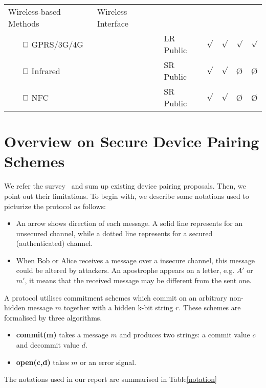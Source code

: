 \begin{table}[ht]
{\begin{tabular}{ p{3.5cm} p{3cm} l | l l l l }
Wireless-based Methods & Wireless Interface & & & & &  \\ 
$\qed$ GPRS/3G/4G & & LR Public & $\surd$ &$\surd$ & $\surd$ & $\surd$  \\
$\qed$ Infrared & & SR Public & $\surd$ & $\surd$ & \O & \O \\ 
$\qed$ NFC & & SR Public & $\surd$ & $\surd$ & \O& \O \\ \hline
\end{tabular}
}
\end{table}

\section{Overview on Secure Device Pairing Schemes}

We refer the survey~\cite{6687314} and sum up existing device pairing proposals. Then, we point out their limitations. To begin with, we describe some notations used to picturize the protocol as follows:

\begin{itemize}
\item An arrow shows direction of each message. A solid line represents for an unsecured channel, while a dotted line represents for a secured (authenticated) channel. 
\item When Bob or Alice receives a message over a insecure channel, this message could be altered by attackers. An apostrophe appears on a letter, e.g. $A'$ or $m'$, it means that the received message may be different from the sent one. 
\end{itemize}

A protocol utilises commitment schemes which commit on an arbitrary non-hidden message $m$ together with a hidden k-bit string $r$. These schemes are formalised by three algorithms.

\begin{itemize}
\item \textbf{commit(m)} takes a message $m$ and produces two strings: a commit value $c$ and decommit value $d$. 
\item \textbf{open(c,d)} takes $m$ or  an error signal. 
\end{itemize} 

The notations used in our report are summarised in Table\ref{notation}

